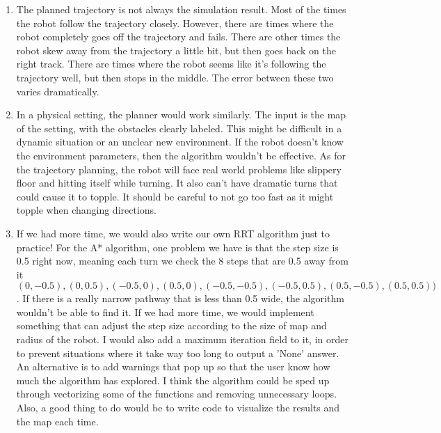 \documentclass{article}
\begin{document}
\begin{enumerate}
    \item The planned trajectory is not always the simulation result. Most of the times the robot follow the trajectory closely. However, there are times where the robot completely goes off the trajectory and fails. There are other times the robot skew away from the trajectory a little bit, but then goes back on the right track. There are times where the robot seems like it's following the trajectory well, but then stops in the middle. The error between these two varies dramatically.
    
    \item In a physical setting, the planner would work similarly. The input is the map of the setting, with the obstacles clearly labeled. This might be difficult in a dynamic situation or an unclear new environment. If the robot doesn't know the environment parameters, then the algorithm wouldn't be effective. As for the trajectory planning, the robot will face real world problems like slippery floor and hitting itself while turning. It also can't have dramatic turns that could cause it to topple. It should be careful to not go too fast as it might topple when changing directions.
    
    \item If we had more time, we would also write our own RRT algorithm just to practice! For the A* algorithm, one problem we have is that the step size is 0.5 right now, meaning each turn we check the 8 steps that are 0.5 away from it $(0, -0.5), (0, 0.5), (-0.5, 0), (0.5, 0), (-0.5, -0.5), (-0.5, 0.5), (0.5, -0.5), (0.5, 0.5))$. If there is a really narrow pathway that is less than 0.5 wide, the algorithm wouldn't be able to find it. If we had more time, we would implement something that can adjust the step size according to the size of map and radius of the robot. I would also add a maximum iteration field to it, in order to prevent situations where it take way too long to output a 'None' answer. An alternative is to add warnings that pop up so that the user know how much the algorithm has explored. I think the algorithm could be sped up through vectorizing some of the functions and removing unnecessary loops. Also, a good thing to do would be to write code to visualize the results and the map each time. 


\end{enumerate}
\newpage  




\end{document}

